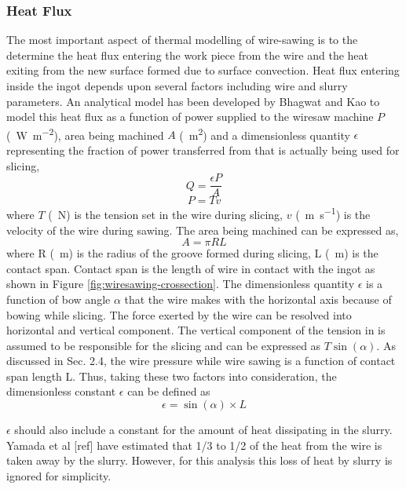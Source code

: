 \subsubsection{Heat Flux}
The most important aspect of thermal modelling of wire-sawing is to the determine the heat flux entering the work piece from the wire and the heat exiting from the new surface formed due to surface convection. Heat flux entering inside the ingot depends upon several factors including wire and slurry parameters. An analytical model has been developed by Bhagwat and Kao \cite{bhagavat2008finite} to model this heat flux as a function of power supplied to the wiresaw machine $P$ (\SI{}{W.m^{-2}}), area being machined $A$ (\SI{}{m^{2}}) and a dimensionless quantity $\epsilon$ representing the fraction of power transferred from that is actually being used for slicing,
\begin{equation}
Q = \frac{\epsilon P}{A}
   \label {wire_eq1}
\end{equation}
\begin{equation}
P = Tv
   \label {wire_eq2}
\end{equation}
where $T$ (\SI{}{N}) is the tension set in the wire during slicing, $v$ (\SI{}{m.s^{-1}}) is the velocity of the wire during sawing. The area being machined can be expressed as,
\begin{equation}
A = \pi R L
   \label {wire_eq3}
\end{equation}
where R (\SI{}{m}) is the radius of the groove formed during slicing, L (\SI{}{m}) is the contact span. Contact span is the length of wire in contact with the ingot as shown in Figure \ref{fig:wiresawing-crossection}. The dimensionless quantity $\epsilon$ is a function of bow angle $\alpha$ that the wire makes with the horizontal axis because of bowing while slicing. The force exerted by the wire can be resolved into horizontal and vertical component. The vertical component of the tension in is assumed to be responsible for the slicing and can be expressed as $T \sin (\alpha)$. As discussed in Sec. 2.4, the wire pressure while wire sawing is a function of contact span length L. Thus, taking these two factors into consideration, the dimensionless constant $\epsilon$ can be defined as 
\begin{equation}
\epsilon = \sin(\alpha) \times L
   \label {wire_eq4}
\end{equation}

$\epsilon$ should also include a constant for the amount of heat dissipating in the slurry. Yamada et al [ref] have estimated that 1/3 to 1/2 of the heat from the wire is taken away by the slurry. However, for this analysis this loss of heat by slurry is ignored for simplicity.  

